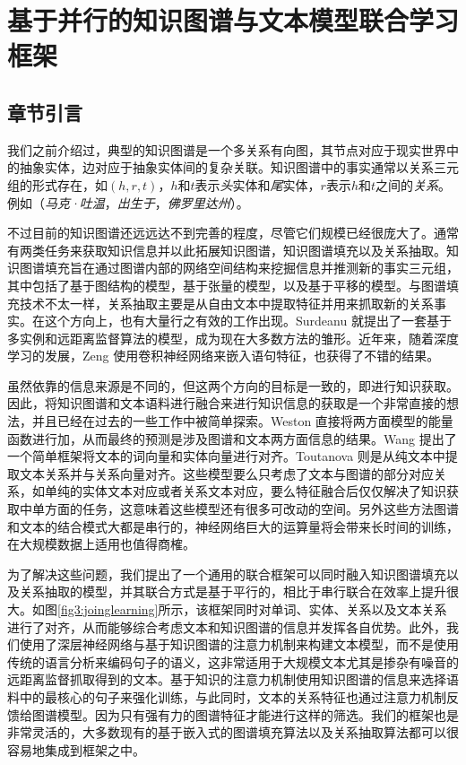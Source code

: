 \chapter{基于并行的知识图谱与文本模型联合学习框架}
\label{cha3:jointlearning}

\section{章节引言}

我们之前介绍过，典型的知识图谱是一个多关系有向图，其节点对应于现实世界中的抽象实体，边对应于抽象实体间的复杂关联。知识图谱中的事实通常以关系三元组的形式存在，如$(h, r, t)$，$h$和$t$表示\emph{头}实体和\emph{尾}实体，$r$表示$h$和$t$之间的\emph{关系}。例如（\emph{马克·吐温}，\emph{出生于}，\emph{佛罗里达州}）。

不过目前的知识图谱还远远达不到完善的程度，尽管它们规模已经很庞大了。通常有两类任务来获取知识信息并以此拓展知识图谱，知识图谱填充以及关系抽取。知识图谱填充旨在通过图谱内部的网络空间结构来挖掘信息并推测新的事实三元组，其中包括了基于图结构的模型\cite{lao2010relational,lao2011random}，基于张量的模型\cite{socher2013reasoning, nickel2016holographic}，以及基于平移的模型\cite{bordes2013translating,ji2015knowledge}。与图谱填充技术不太一样，关系抽取主要是从自由文本中提取特征并用来抓取新的关系事实。在这个方向上，也有大量行之有效的工作出现。Surdeanu \cite{surdeanu2012multi}就提出了一套基于多实例和远距离监督算法的模型，成为现在大多数方法的雏形。近年来，随着深度学习的发展，Zeng \cite{zeng2014relation}使用卷积神经网络来嵌入语句特征，也获得了不错的结果。

虽然依靠的信息来源是不同的，但这两个方向的目标是一致的，即进行知识获取。因此，将知识图谱和文本语料进行融合来进行知识信息的获取是一个非常直接的想法，并且已经在过去的一些工作中被简单探索。Weston \cite{weston2013connecting}直接将两方面模型的能量函数进行加，从而最终的预测是涉及图谱和文本两方面信息的结果。Wang \cite{wang2014knowledge}提出了一个简单框架将文本的词向量和实体向量进行对齐。Toutanova \cite{toutanova2015representing} 则是从纯文本中提取文本关系并与关系向量对齐。这些模型要么只考虑了文本与图谱的部分对应关系，如单纯的实体文本对应或者关系文本对应，要么特征融合后仅仅解决了知识获取中单方面的任务，这意味着这些模型还有很多可改动的空间。另外这些方法图谱和文本的结合模式大都是串行的，神经网络巨大的运算量将会带来长时间的训练，在大规模数据上适用也值得商榷。

为了解决这些问题，我们提出了一个通用的联合框架可以同时融入知识图谱填充以及关系抽取的模型，并其联合方式是基于平行的，相比于串行联合在效率上提升很大。如图\ref{fig3:joinglearning}所示，该框架同时对单词、实体、关系以及文本关系进行了对齐，从而能够综合考虑文本和知识图谱的信息并发挥各自优势。此外，我们使用了深层神经网络与基于知识图谱的注意力机制来构建文本模型，而不是使用传统的语言分析来编码句子的语义，这非常适用于大规模文本尤其是掺杂有噪音的远距离监督抓取得到的文本。基于知识的注意力机制使用知识图谱的信息来选择语料中的最核心的句子来强化训练，与此同时，文本的关系特征也通过注意力机制反馈给图谱模型。因为只有强有力的图谱特征才能进行这样的筛选。我们的框架也是非常灵活的，大多数现有的基于嵌入式的图谱填充算法以及关系抽取算法都可以很容易地集成到框架之中。

